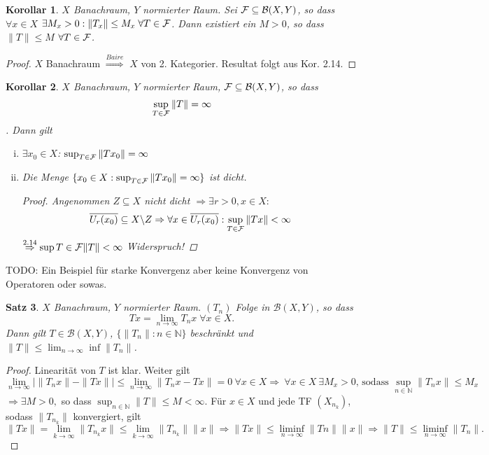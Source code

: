 \documentclass[ngerman]{report}
\theoremstyle{plain}%
\newtheorem{thm}{Satz}[chapter]
\newtheorem{cor}[thm]{Korollar}
\theoremstyle{definition}%
\theoremstyle{myStyle}
\newcommand{\N}{\mathbb{N}}
\newcommand{\BS}[1][X,Y]{\mathcal{B}(#1)} %
\newcommand{\norm}[1]{\|#1\|}
\newcommand{\df}[1][]{%
	\overset{#1}{\Rightarrow}
}
\newcommand{\U}[2][1]{U_{#1}(#2)} %
\newcommand{\limes}[1][\infty]{\lim_{n \to #1}}
\newcommand{\disp}{\displaystyle}
\begin{document}
	\begin{cor}
		$X$ Banachraum, $Y$ normierter Raum. Sei $\F \subseteq \BS$, so dass $\forall x \in X$ $\exists M_x > 0: \norm{T_x} \leq M_x \; \forall T\in \F$. Dann existiert ein $M > 0$, so dass $\norm{T} \leq M$ $\forall T \in \mathcal{F}$.
	\end{cor}

	\begin{proof}
		$X$ Banachraum $\df[Baire]$ $X$ von 2. Kategorier. Resultat folgt aus Kor. 2.14.
	\end{proof}

	\begin{cor}
		$X$ Banachraum, $Y$ normierter Raum, $\F \subseteq \BS$, so dass 
			$$ \sup_{T\in\F} \norm{T} = \infty \vspace{-1em} $$. 
		Dann gilt 
			\begin{enumerate}[(i)]
				\item $\exists x_0 \in X$: $\sup_{T\in \F} \norm{Tx_0} = \infty$
				\item Die Menge $\{x_0 \in X: \sup_{T\in \F} \norm{Tx_0} = \infty\}$ ist dicht.
					\begin{proof}
						Angenommen $Z \subseteq X$ nicht dicht $ \df \exists r>0, x\in X: $
							$$ \overline{\U[r]{x_0}} \subseteq X \backslash Z \df \forall x \in \overline{\U[r]{x_0}} : \sup_{T\in\F} \norm{Tx} < \infty$$
							$\df[2.14] \sup{T\in \F} \norm{T} < \infty$ Widerspruch!
					\end{proof}
			\end{enumerate}
	\end{cor}

TODO: Ein Beispiel für starke Konvergenz aber keine Konvergenz von Operatoren oder sowas.

	\begin{thm}
		$X$ Banachraum, $Y$ normierter Raum. $(T_n)$ Folge in $\BS$, so dass 
			$$ Tx = \limes T_n x \; \forall x\in X.$$ 
		Dann gilt $T\in \BS$, $\{\norm{T_n} : n\in \N\}$ beschränkt und $\norm{T} \leq \limes\inf \norm{T_n}$.
	\end{thm}

	\begin{proof}
		Linearität von $T$ ist klar. Weiter gilt 
		\[
		\limes |\norm{T_nx}-\norm{Tx}| \leq \limes \norm{T_nx-Tx} = 0 ~\forall x \in X \df ~\forall x \in X ~\exists M_x>0 \text{, sodass } \sup_{n \in \N} \norm{T_nx}\leq M_x
		\]
		$\df \exists M>0,$ so dass $ \disp \sup_{n \in \N} \norm{T}\leq M<\infty$. Für $x \in X$ und jede TF $(X_{n_k})$, sodass $\norm{T_{n_k}}$ konvergiert, gilt
		\[
		\norm{Tx}=\lim_{k \to \infty}\norm{T_{n_k}x}\leq \lim_{k \to \infty}\norm{T_{n_k}}\norm{x} \df \norm{Tx} \leq \liminf_{n \to \infty} \norm{Tn}\norm{x} \df \norm{T} \leq \liminf_{n \to \infty} \norm{T_n}.
		\]
	\end{proof}
\end{document}
